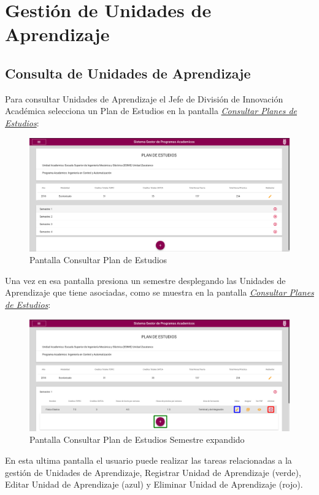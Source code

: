 \section{Gestión de Unidades de Aprendizaje}
    \subsection{Consulta de Unidades de Aprendizaje}
Para consultar Unidades de Aprendizaje el Jefe de División de Innovación Académica selecciona un Plan de Estudios en la pantalla \hyperlink{consultarS}{\textit{Consultar Planes de Estudios}}:\\
\begin{figure}[H]
    \centering
    \hypertarget{consultarS}{\includegraphics[width=0.7\linewidth]{images/GUA/consultarS}}
    \caption{Pantalla Consultar Plan de Estudios}
    \label{consultarS}
\end{figure}
\newpage
Una vez en esa pantalla presiona un semestre desplegando las Unidades de Aprendizaje que tiene asociadas, como se muestra en la pantalla \hyperlink{consultarUA}{\textit{Consultar Planes de Estudios}}:\\
\begin{figure}[H]
    \centering
    \hypertarget{consultarUA}{\includegraphics[width=0.7\linewidth]{images/GUA/consultarUA}}
    \caption{Pantalla Consultar Plan de Estudios Semestre expandido}
    \label{consultarUA}
\end{figure}
En esta ultima pantalla el usuario puede realizar las tareas relacionadas a la gestión de Unidades de Aprendizaje, Registrar Unidad de Aprendizaje (verde), Editar Unidad de Aprendizaje (azul) y Eliminar Unidad de Aprendizaje (rojo).
\newpage
